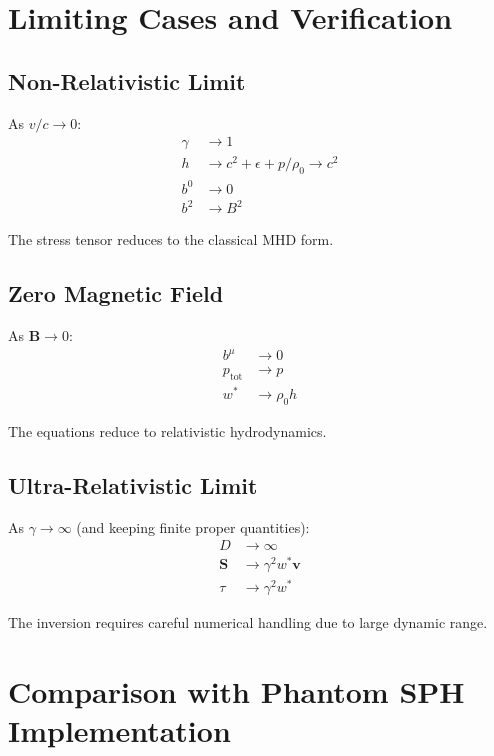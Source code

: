 \documentclass[12pt,a4paper]{article}
\begin{document}
\section{Limiting Cases and Verification}
\label{app:limits}

\subsection{Non-Relativistic Limit}

As $v/c \to 0$:
\begin{align}
\gamma &\to 1 \\
h &\to c^2 + \epsilon + p/\rho_0 \to c^2 \\
b^0 &\to 0 \\
b^2 &\to B^2
\end{align}

The stress tensor reduces to the classical MHD form.

\subsection{Zero Magnetic Field}

As $\bm{B} \to 0$:
\begin{align}
b^\mu &\to 0 \\
p_\text{tot} &\to p \\
w^* &\to \rho_0 h
\end{align}

The equations reduce to relativistic hydrodynamics.

\subsection{Ultra-Relativistic Limit}

As $\gamma \to \infty$ (and keeping finite proper quantities):
\begin{align}
D &\to \infty \\
\bm{S} &\to \gamma^2 w^* \bm{v} \\
\tau &\to \gamma^2 w^*
\end{align}

The inversion requires careful numerical handling due to large dynamic range.

\section{Comparison with Phantom SPH Implementation}
\end{document}
